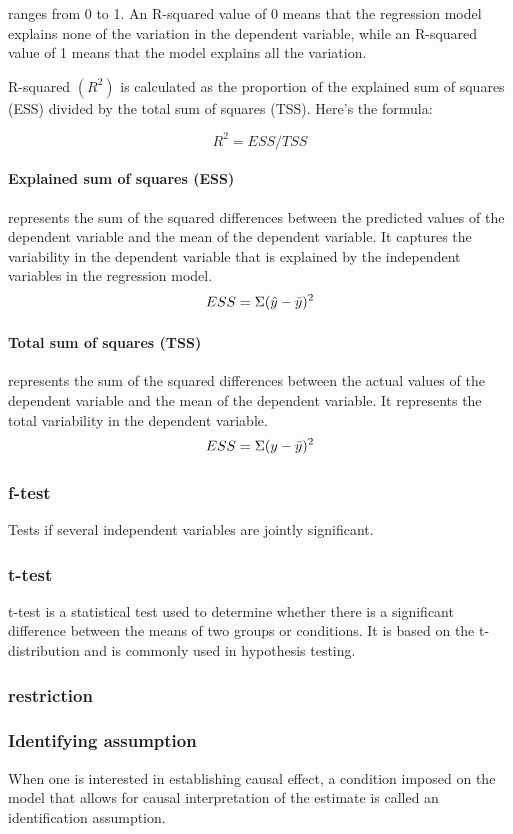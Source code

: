\documentclass[a3paper, 8pt]{extarticle}
\begin{document}
\begin{multicols*}{5}
ranges from 0 to 1. An R-squared value of 0 means that the regression model explains none of the variation in the dependent variable, while an R-squared value of 1 means that the model explains all the variation.

R-squared $(R^2)$ is calculated as the proportion of the explained sum of squares (ESS) divided by the total sum of squares (TSS). Here's the formula:

$$R^2 = ESS / TSS$$

\paragraph{Explained sum of squares (ESS)} represents the sum of the squared differences between the predicted values of the dependent variable and the mean of the dependent variable. It captures the variability in the dependent variable that is explained by the independent variables in the regression model.
$$ESS = \Sigma(\hat{y} - \Bar{y})^2$$

\paragraph{Total sum of squares (TSS)} represents the sum of the squared differences between the actual values of the dependent variable and the mean of the dependent variable. It represents the total variability in the dependent variable.
$$ESS = \Sigma(y - \Bar{y})^2$$
\subsubsection{f-test}
Tests if several independent variables are jointly significant.

\subsubsection{t-test}
t-test is a statistical test used to determine whether there is a significant difference between the means of two groups or conditions. It is based on the t-distribution and is commonly used in hypothesis testing.

\subsubsection{restriction}

\subsubsection{Identifying assumption}
When one is interested in establishing causal effect, a condition imposed on the model that allows for causal interpretation of the estimate is called an identification assumption.



\end{multicols*}
\end{document}

